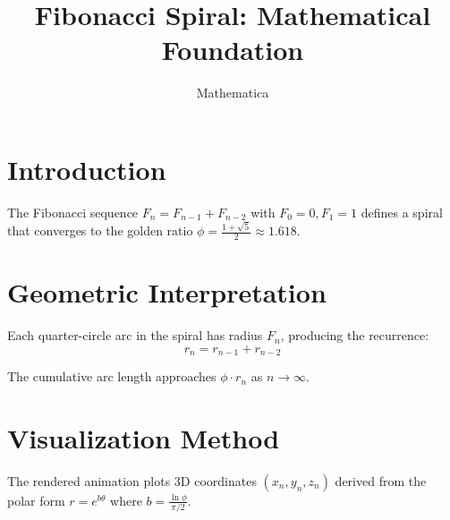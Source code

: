 \documentclass{article}
\title{Fibonacci Spiral: Mathematical Foundation}
\author{Mathematica}
\begin{document}
\maketitle

\section{Introduction}

The Fibonacci sequence \( F_n = F_{n-1} + F_{n-2} \) with \( F_0 = 0, F_1 = 1 \)
defines a spiral that converges to the golden ratio \( \phi = \frac{1 + \sqrt{5}}{2} \approx 1.618 \).

\section{Geometric Interpretation}

Each quarter-circle arc in the spiral has radius \( F_n \), producing the recurrence:
\[
  r_n = r_{n-1} + r_{n-2}
\]

The cumulative arc length approaches \( \phi \cdot r_n \) as \( n \to \infty \).

\section{Visualization Method}

The rendered animation plots 3D coordinates \( (x_n, y_n, z_n) \) derived from the
polar form \( r = e^{b\theta} \) where \( b = \frac{\ln \phi}{\pi/2} \).
\end{document}
